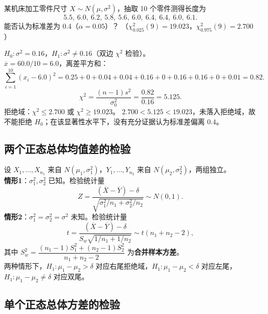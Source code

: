 ﻿\documentclass[lang=cn,11pt]{elegantbook}
\begin{document}
\begin{exercise} \label{ex:ht_chi2_two}
某机床加工零件尺寸 \(X\sim N(\mu,\sigma^2)\)，抽取 10 个零件测得长度为
\[
5.5,\ 6.0,\ 6.2,\ 5.8,\ 5.6,\ 6.0,\ 6.4,\ 6.4,\ 6.0,\ 6.1.
\]
能否认为标准差为 0.4（\(\alpha=0.05\)）？
（\(\chi^2_{0.025}(9)=19.023\)，\(\chi^2_{0.975}(9)=2.700\)）
\end{exercise}
\begin{solution}
\(H_0\colon\sigma^2=0.16\)，\(H_1\colon\sigma^2\neq0.16\)（双边 \(\chi^2\) 检验）。\\
\(\overline{x}=60.0/10=6.0\)，离差平方和：
\[
\sum_{i=1}^{10}(x_i-6.0)^2=0.25+0+0.04+0.04+0.16+0+0.16+0.16+0+0.01=0.82.
\]
\[
\chi^2=\frac{(n-1)s^2}{\sigma_0^2}=\frac{0.82}{0.16}=5.125.
\]
拒绝域：\(\chi^2\leq 2.700\) 或 \(\chi^2\geq 19.023\)。
\(2.700<5.125<19.023\)，未落入拒绝域，故不能拒绝 \(H_0\)；在该显著性水平下，没有充分证据认为标准差偏离 \(0.4\)。
\end{solution}


\subsection{两个正态总体均值差的检验}

\begin{property}[两个正态总体均值差的检验]\label{prop:two-sample-mean-test}
设 \(X_1,\dots,X_{n_1}\) 来自 \(N(\mu_1,\sigma_1^2)\)，\(Y_1,\dots,Y_{n_2}\) 来自 \(N(\mu_2,\sigma_2^2)\)，两组独立。\\
\textbf{情形1}：\(\sigma_1^2, \sigma_2^2\) 已知。检验统计量
\[
Z = \frac{(\overline{X}-\overline{Y})-\delta}{\sqrt{\sigma_1^2/n_1+\sigma_2^2/n_2}} \sim N(0,1).
\]
\textbf{情形2}：\(\sigma_1^2=\sigma_2^2=\sigma^2\) 未知。检验统计量
\[
t = \frac{(\overline{X}-\overline{Y})-\delta}{S_w\sqrt{1/n_1+1/n_2}} \sim t(n_1+n_2-2),
\]
其中 \(S_w^2 = \dfrac{(n_1-1)S_1^2+(n_2-1)S_2^2}{n_1+n_2-2}\) 为\textbf{合并样本方差}。\\
两种情形下，\(H_1\colon \mu_1-\mu_2 > \delta\) 对应右尾拒绝域，\(H_1\colon \mu_1-\mu_2 < \delta\) 对应左尾，\(H_1\colon \mu_1-\mu_2 \neq \delta\) 对应双尾。
\end{property}

\subsection{单个正态总体方差的检验}
\end{document}
